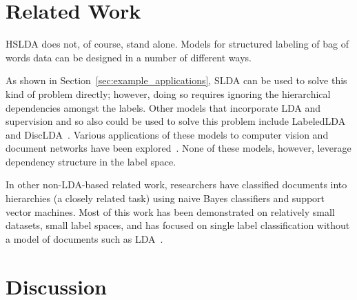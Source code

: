 
\section{Related Work}
\label{sec:related_work}


HSLDA does not, of course, stand alone.  Models for structured labeling of bag of words data can be designed in a number of different ways.

As shown  in Section~\ref{sec:example_applications},  SLDA can be used to solve this kind of problem directly; however, doing so requires ignoring the hierarchical
dependencies amongst the labels.  Other models that incorporate LDA and supervision and so also could be used to solve this problem include
LabeledLDA~\cite{Ramage2009} and DiscLDA~\cite{DiscLDA}.  Various applications of these models to 
computer vision and document networks have been explored~\cite{wangbleifeifei08,RelationalLDA}.
None of these models, however, leverage dependency structure in the label space.

In other non-LDA-based related work, researchers have classified documents into hierarchies (a closely related task) using naive Bayes classifiers
and support vector machines. Most of this work has been demonstrated on relatively
small datasets, small label spaces, and has focused on single label classification without
a model of documents such as LDA~\cite{mccallum99building,Dumais2000HCW,Kollerilprints291,Chakrabarti1998SFS}.  
\section{Discussion}
\label{sec:discussion}


